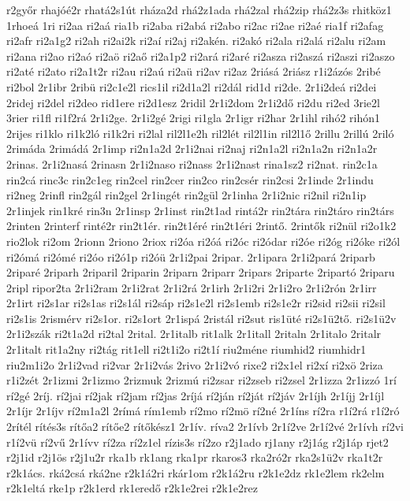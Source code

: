 {r2győr
rhajóé2r
rhatá2s1út
rháza2d
rhá2z1ada
rhá2zal
rhá2zip
rhá2z3s
rhitköz1
1rhoeá
1ri
ri2aa
ri2aá
ria1b
ri2aba
ri2abá
ri2abo
ri2ac
ri2ae
ri2aé
ria1f
ri2afag
ri2afr
ri2a1g2
ri2ah
ri2ai2k
ri2aí
ri2aj
ri2akén.
ri2akó
ri2ala
ri2alá
ri2alu
ri2am
ri2ana
ri2ao
ri2aó
ri2aö
ri2aő
ri2a1p2
ri2ará
ri2aré
ri2asza
ri2aszá
ri2aszi
ri2aszo
ri2até
ri2ato
ri2a1t2r
ri2au
ri2aú
ri2aü
ri2av
ri2az
2riásá
2riász
r1i2ázós
2ribé
ri2bol
2r1ibr
2ribü
ri2c1e2l
rics1il
ri2d1a2l
ri2dál
rid1d
ri2de.
2r1i2deá
ri2dei
2ridej
ri2del
ri2deo
rid1ere
ri2d1esz
2ridil
2r1i2dom
2r1i2dő
ri2du
ri2ed
3rie2l
3rier
ri1fl
ri1f2rá
2r1i2ge.
2r1i2gé
2rigi
ri1gla
2r1igr
ri2har
2r1ihl
rihó2
rihón1
2rijes
ri1klo
ri1k2ló
ri1k2ri
ri2lal
ril2l1e2h
ril2lét
ril2l1in
ril2l1ő
2rillu
2rillú
2riló
2rimáda
2rimádá
2r1imp
ri2n1a2d
2r1i2nai
ri2naj
ri2n1a2l
ri2n1a2n
ri2n1a2r
2rinas.
2r1i2nasá
2rinasn
2r1i2naso
ri2nass
2r1i2nast
rina1sz2
ri2nat.
rin2c1a
rin2cá
rinc3c
rin2c1eg
rin2cel
rin2cer
rin2co
rin2csér
rin2csi
2r1inde
2r1indu
ri2neg
2rinfl
rin2gál
rin2gel
2r1ingét
rin2gül
2r1inha
2r1i2nic
ri2nil
ri2n1ip
2r1injek
rin1kré
rin3n
2r1insp
2r1inst
rin2t1ad
rintá2r
rin2tára
rin2táro
rin2társ
2rinten
2rinterf
rinté2r
rin2t1ér.
rin2t1éré
rin2t1éri
2rintő.
2rintők
ri2nül
ri2o1k2
rio2lok
ri2om
2rionn
2riono
2riox
ri2óa
ri2óá
ri2óc
ri2ódar
ri2óe
ri2óg
ri2óke
ri2ól
ri2ómá
ri2ómé
ri2óo
ri2ó1p
ri2óü
2r1i2pai
2ripar.
2r1ipara
2r1i2pará
2riparb
2riparé
2riparh
2riparil
2riparin
2riparn
2riparr
2ripars
2riparte
2ripartó
2riparu
2ripl
ripor2ta
2r1i2ram
2r1i2rat
2r1i2rá
2r1irh
2r1i2ri
2r1i2ro
2r1i2rón
2r1irr
2r1irt
ri2s1ar
ri2s1as
ri2s1ál
ri2sáp
ri2s1e2l
ri2s1emb
ri2s1e2r
ri2sid
ri2sii
ri2sil
ri2s1is
2rismérv
ri2s1or.
ri2s1ort
2r1ispá
2ristál
ri2sut
ris1üté
ri2s1ü2tő.
ri2s1ü2v
2r1i2szák
ri2t1a2d
ri2tal
2rital.
2r1italb
rit1alk
2r1itall
2ritaln
2r1italo
2ritalr
2r1italt
rit1a2ny
ri2tág
rit1ell
ri2t1i2o
ri2t1í
riu2méne
riumhid2
riumhidr1
riu2m1i2o
2r1i2vad
ri2var
2r1i2vás
2rivo
2r1i2vó
rixe2
ri2x1el
ri2xí
ri2xö
2riza
r1i2zét
2r1izmi
2r1izmo
2rizmuk
2rizmú
ri2zsar
ri2zseb
ri2zsel
2r1izza
2r1izzó
1rí
rí2gé
2ríj.
rí2jai
rí2jak
rí2jam
rí2jas
2ríjá
rí2ján
rí2ját
rí2jáv
2r1íjh
2r1íjj
2r1íjl
2r1íjr
2r1íjv
rí2m1a2l
2rímá
rím1emb
rí2mo
rí2mö
rí2né
2r1íns
rí2ra
r1í2rá
r1í2ró
2rítél
rítés3s
rítőa2
rítőe2
rítőkész1
2r1ív.
ríva2
2r1ívb
2r1í2ve
2r1í2vé
2r1ívh
rí2vi
r1í2vü
rí2vű
2r1ívv
rí2za
rí2z1el
rízis3s
rí2zo
r2j1ado
rj1any
r2j1ág
r2j1áp
rjet2
r2j1id
r2j1ös
r2j1u2r
rka1b
rk1ang
rka1pr
rkaros3
rka2ró2r
rka2s1ü2v
rka1t2r
r2k1ács.
rká2csá
rká2ne
r2k1á2ri
rkár1om
r2k1á2ru
r2k1e2dz
rk1e2lem
rk2elm
r2k1eltá
rke1p
r2k1erd
rk1eredő
r2k1e2rei
r2k1e2rez
}
